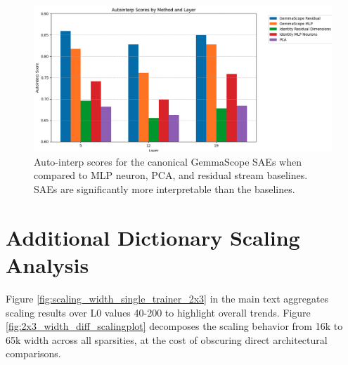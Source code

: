 \documentclass{article}
\theoremstyle{plain}
\theoremstyle{definition}
\theoremstyle{remark}
\begin{document}
\begin{figure}[h!]
\centering
\includegraphics[width=\columnwidth]{images/Autointerp_by_location.png}
\caption{Auto-interp scores for the canonical GemmaScope SAEs when compared to MLP neuron, PCA, and residual stream baselines. SAEs are significantly more interpretable than the baselines.}
\label{fig:autointerp_by_location}
\end{figure}



\clearpage
\section{Additional Dictionary Scaling Analysis}
\label{app:scaling-analysis}

Figure \ref{fig:scaling_width_single_trainer_2x3} in the main text aggregates scaling results over L0 values 40-200 to highlight overall trends. Figure \ref{fig:2x3_width_diff_scalingplot} decomposes the scaling behavior from 16k to 65k width across all sparsities, at the cost of obscuring direct architectural comparisons.
\end{document}

